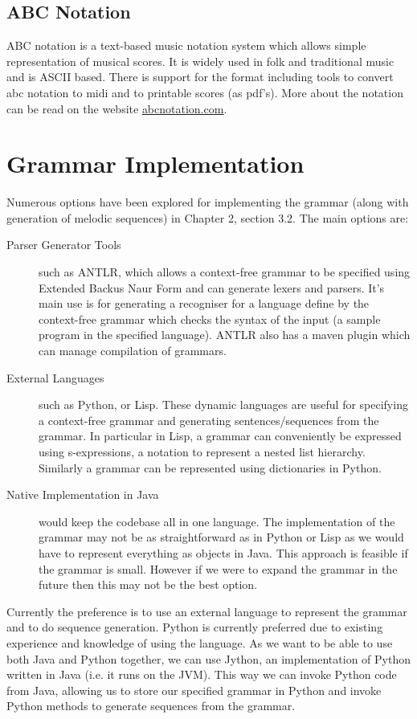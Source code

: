 \documentclass[pdftex,12pt,a4paper]{report}
\begin{document}
\subsection{ABC Notation}
ABC notation is a text-based music notation system which allows simple representation of musical scores. It is widely used in folk and traditional music and is ASCII based. There is support for the format including tools to convert abc notation to midi and to printable scores (as pdf's). More about the notation can be read on the website \url{abcnotation.com}.

\section{Grammar Implementation}
Numerous options have been explored for implementing the grammar (along with generation of melodic sequences) in Chapter 2, section 3.2. The main options are:

\begin{description}
  \item[Parser Generator Tools] such as ANTLR, which allows a context-free grammar to be specified using Extended Backus Naur Form and can generate lexers and parsers. It's main use is for generating a recogniser for a language define by the context-free grammar which checks the syntax of the input (a sample program in the specified language). ANTLR also has a maven plugin which can manage compilation of grammars.
  \item[External Languages] such as Python, or Lisp. These dynamic languages are useful for specifying a context-free grammar and generating sentences/sequences from the grammar. In particular in Lisp, a grammar can conveniently be expressed using s-expressions, a notation to represent a nested list hierarchy. Similarly a grammar can be represented using dictionaries in Python. 
  \item[Native Implementation in Java] would keep the codebase all in one language. The implementation of the grammar may not be as straightforward as in Python or Lisp as we would have to represent everything as objects in Java. This approach is feasible if the grammar is small. However if we were to expand the grammar in the future then this may not be the best option.
\end{description}

Currently the preference is to use an external language to represent the grammar and to do sequence generation. Python is currently preferred due to existing experience and knowledge of using the language. As we want to be able to use both Java and Python together, we can use Jython, an implementation of Python written in Java (i.e. it runs on the JVM). This way we can invoke Python code from Java, allowing us to store our specified grammar in Python and invoke Python methods to generate sequences from the grammar.
\end{document}
